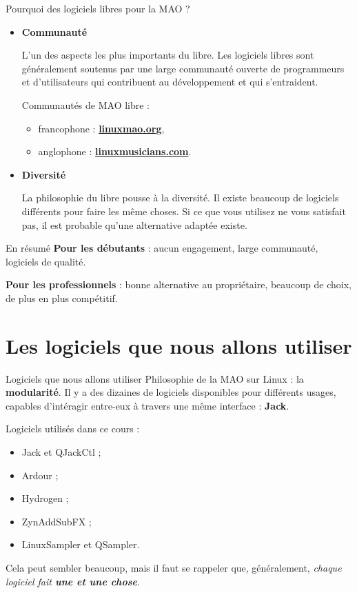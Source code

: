 \documentclass{beamer}
\begin{document}
\begin{frame}{Pourquoi des logiciels libres pour la MAO ?}
  \begin{itemize}
  \item \textbf{Communauté}
  
    L'un des aspects les plus importants du libre. Les logiciels libres sont généralement soutenus par une large communauté ouverte de programmeurs et d'utilisateurs qui contribuent au développement et qui s'entraident.
    
    Communautés de MAO libre :
    \begin{itemize}
    \item francophone : \textbf{\url{linuxmao.org}},
    \item anglophone : \textbf{\url{linuxmusicians.com}}.
    \end{itemize}
    
  \item \textbf{Diversité}
    
    La philosophie du libre pousse à la diversité. Il existe beaucoup de logiciels différents pour faire les même choses. Si ce que vous utilisez ne vous satisfait pas, il est probable qu'une alternative adaptée existe.
  \end{itemize}
\end{frame}

\begin{frame}{En résumé}
  \textbf{Pour les débutants} : aucun engagement, large communauté, logiciels de qualité.
  \medskip
  
  \textbf{Pour les professionnels} : bonne alternative au propriétaire, beaucoup de choix, de plus en plus compétitif.
\end{frame}



\section{Les logiciels que nous allons utiliser}
\begin{frame}{Logiciels que nous allons utiliser}
  Philosophie de la MAO sur Linux : la \textbf{modularité}. Il y a des dizaines de logiciels disponibles pour différents usages, capables d'intéragir entre-eux à travers une même interface : \textbf{Jack}.
  \medskip
  
  Logiciels utilisés dans ce cours :
  \begin{itemize}
  \item Jack et QJackCtl ;
  \item Ardour ;
  \item Hydrogen ;
  \item ZynAddSubFX ;
  \item LinuxSampler et QSampler.
  \end{itemize}
  
  Cela peut sembler beaucoup, mais il faut se rappeler que, généralement, \emph{chaque logiciel fait \textbf{une et une chose}}.
\end{frame}
\end{document}
